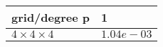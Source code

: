 \begin{tabular}{ll}
\hline
 grid/degree p         & 1          \\
\hline
 $4 \times 4 \times 4$ & $1.04e-03$ \\
\hline
\end{tabular}